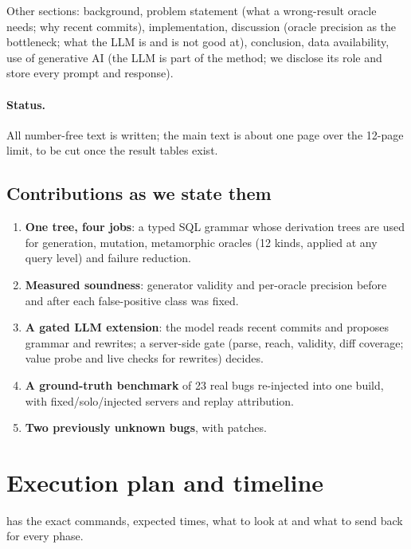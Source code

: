 Other sections: background, problem statement (what a wrong-result oracle
needs; why recent commits), implementation, discussion (oracle precision as the
bottleneck; what the LLM is and is not good at), conclusion, data availability,
use of generative AI (the LLM is part of the method; we disclose its role and
store every prompt and response).

\paragraph{Status.} All number-free text is written; the main text is about one
page over the 12-page limit, to be cut once the result tables exist.

\subsection{Contributions as we state them}
\begin{enumerate}
  \item \textbf{One tree, four jobs}: a typed SQL grammar whose derivation
    trees are used for generation, mutation, metamorphic oracles (12 kinds,
    applied at any query level) and failure reduction.
  \item \textbf{Measured soundness}: generator validity and per-oracle
    precision before and after each false-positive class was fixed.
  \item \textbf{A gated LLM extension}: the model reads recent commits and
    proposes grammar and rewrites; a server-side gate (parse, reach, validity,
    diff coverage; value probe and live checks for rewrites) decides.
  \item \textbf{A ground-truth benchmark} of 23 real \pg bugs re-injected into
    one build, with fixed/solo/injected servers and replay attribution.
  \item \textbf{Two previously unknown \pg bugs}, with patches.
\end{enumerate}

\section{Execution plan and timeline}
\label{sec:plan}

 has the exact commands, expected times, what to
look at and what to send back for every phase.

